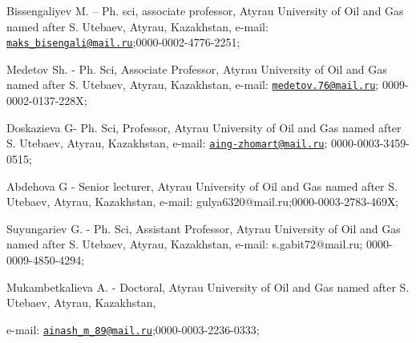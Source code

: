 \begin{authorinfo}
Bissengaliyev M. -- Ph. sci, associate professor, Atyrau Uni󠀁versity of
Oil and Gas nam󠀁ed aft󠀁er S. Ute󠀁baev, Aty󠀁rau, Kaz󠀁akhstan, e-mail:
\href{mailto:maks\_bisengali@mail.ru}{\nolinkurl{maks\_bisengali@mail.ru}};0000-0002-4776-2251;

Medetov Sh. - Ph. Sci, Associate Professor, Atyrau Uni󠀁versity of Oil and
Gas nam󠀁ed aft󠀁er S. Ute󠀁baev, Aty󠀁rau, Kaz󠀁akhstan, e-mail:
\href{mailto:medetov.76@mail.ru}{\nolinkurl{medetov.76@mail.ru}};
0009-0002-0137-228X;

Doskazieva G- Ph. Sci, Professor, Atyrau Uni󠀁versity of Oil and Gas nam󠀁ed
aft󠀁er S. Ute󠀁baev, Aty󠀁rau, Kaz󠀁akhstan, e-mail:
\href{mailto:aing-zhomart@mail.ru}{\nolinkurl{aing-zhomart@mail.ru}};
0000-0003-3459-0515;

Abdehova G - Senior lecturer, Atyrau Uni󠀁versity of Oil and Gas
nam󠀁ed aft󠀁er S. Ute󠀁baev, Aty󠀁rau, Kaz󠀁akhstan, e-mail:
gulya6320@mail.ru;0000-0003-2783-469Х;

Suyungariev G. - Ph. Sci, Assistant Professor, Atyrau
Uni󠀁versity of Oil and Gas nam󠀁ed aft󠀁er S. Ute󠀁baev, Aty󠀁rau, Kaz󠀁akhstan,
e-mail: s.gabit72@mail.ru;
0000-0009-4850-4294;

Mukambetkalieva A. - Doctoral, Atyrau Uni󠀁versity of Oil and Gas nam󠀁ed
aft󠀁er S. Ute󠀁baev, Aty󠀁rau, Kaz󠀁akhstan,

e-mail: \href{mailto:ainash\_m_89@mail.ru}{\nolinkurl{ainash\_m\_89@mail.ru}};0000-0003-2236-0333;\
\end{authorinfo}
